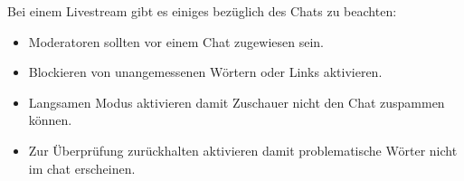 
Bei einem Livestream gibt es einiges bezüglich des Chats zu beachten:
\begin{itemize}
  \item Moderatoren sollten vor einem Chat zugewiesen sein.
  \item Blockieren von unangemessenen Wörtern oder Links aktivieren.
  \item Langsamen Modus aktivieren damit Zuschauer nicht den Chat zuspammen können.
  \item \grqq{}Zur Überprüfung zurückhalten\grqq{} aktivieren damit problematische Wörter nicht im chat erscheinen.
\end{itemize}





%

%
%
%















%





